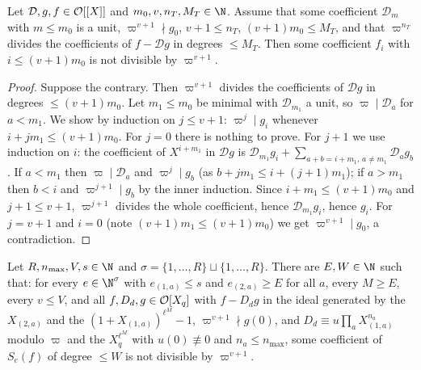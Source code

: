 \begin{lemma}\label{pf:baselat1:congmul}
Let $\mathcal D,g,f\in\mathcal O[[X]]$ and $m_0,v,n_T,M_T\in\N$. Assume that some coefficient $\mathcal D_m$ with
$m\le m_0$ is a unit, $\varpi^{v+1}\nmid g_0$, $v+1\le n_T$, $(v+1)m_0\le M_T$, and that $\varpi^{n_T}$ divides the
coefficients of $f-\mathcal Dg$ in degrees $\le M_T$. Then some coefficient $f_i$ with $i\le(v+1)m_0$ is not divisible by
$\varpi^{v+1}$.
\end{lemma}

\begin{proof}
Suppose the contrary. Then $\varpi^{v+1}$ divides the coefficients of $\mathcal Dg$ in degrees $\le(v+1)m_0$. Let $m_1\le
m_0$ be minimal with $\mathcal D_{m_1}$ a unit, so $\varpi\mid\mathcal D_a$ for $a<m_1$. We show by induction on $j\le v+1$:
$\varpi^j\mid g_i$ whenever $i+jm_1\le(v+1)m_0$. For $j=0$ there is nothing to prove. For $j+1$ we use induction on $i$:
the coefficient of $X^{i+m_1}$ in $\mathcal Dg$ is $\mathcal D_{m_1}g_i+\sum_{a+b=i+m_1,\,a\ne m_1}\mathcal D_ag_b$. If $a<m_1$
then $\varpi\mid\mathcal D_a$ and $\varpi^j\mid g_b$ (as $b+jm_1\le i+(j+1)m_1$); if $a>m_1$ then $b<i$ and
$\varpi^{j+1}\mid g_b$ by the inner induction. Since $i+m_1\le(v+1)m_0$ and $j+1\le v+1$, $\varpi^{j+1}$ divides the whole
coefficient, hence $\mathcal D_{m_1}g_i$, hence $g_i$. For $j=v+1$ and $i=0$ (note $(v+1)m_1\le(v+1)m_0$) we get
$\varpi^{v+1}\mid g_0$, a contradiction.
\end{proof}

\begin{proposition}\label{pf:baselat1:lowfactor}
Let $R,n_{\max},V,s\in\N$ and $\sigma=\{1,\dots,R\}\sqcup\{1,\dots,R\}$. There are $E,W\in\N$ such that: for every
$e\in\N^\sigma$ with $e_{(1,a)}\le s$ and $e_{(2,a)}\ge E$ for all $a$, every $M\ge E$, every $v\le V$, and all
$f,D_d,g\in\mathcal O[X_q]$ with $f-D_dg$ in the ideal generated by the $X_{(2,a)}$ and the $(1+X_{(1,a)})^{\ell^M}-1$,
$\varpi^{v+1}\nmid g(0)$, and $D_d\equiv u\prod_aX_{(1,a)}^{n_a}$ modulo $\varpi$ and the $X_q^{\ell^M}$ with $u(0)\not\equiv0$
and $n_a\le n_{\max}$, some coefficient of $S_e(f)$ of degree $\le W$ is not divisible by $\varpi^{v+1}$.
\end{proposition}


